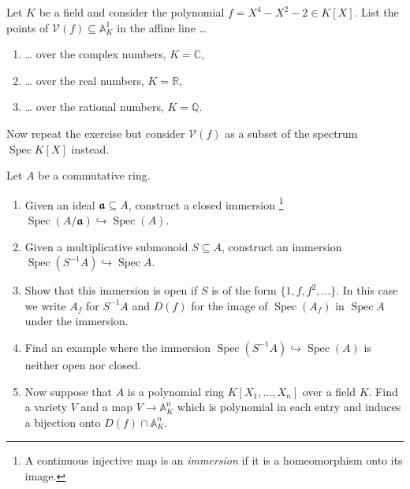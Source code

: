\documentclass{exercises}
\DeclareMathOperator{\Spec}{Spec}
\begin{document}
\begin{exercise}
  Let $K$ be a field and consider the polynomial $f=X^4-X^2-2 ∈ K[X]$.
  List the points of $𝒱(f)⊆𝔸^1_K$ in the affine line …
  \begin{enumerate}
    \item … over the complex numbers, $K=ℂ$,
    \item … over the real numbers, $K=ℝ$,
    \item … over the rational numbers, $K=ℚ$.
  \end{enumerate}
  Now repeat the exercise but consider $𝒱(f)$ as a subset of the spectrum $\Spec K[X]$ instead.
\end{exercise}

\begin{exercise}
  Let $A$ be a commutative ring.
  \begin{enumerate}
    \item Given an ideal $𝖆⊆A$, construct a closed immersion%
      \footnote{A continuous injective map is an \emph{immersion} if it is a homeomorphism onto its image.}
      $\Spec(A/𝖆) ↪ \Spec(A)$.
    \item Given a multiplicative submonoid $S⊆A$, construct an immersion $\Spec(S^{-1}A) ↪ \Spec A$.
    \item Show that this immersion is open if $S$ is of the form $\{1,f,f^2,\dots\}$.
      In this case we write $A_f$ for $S^{-1}A$ and $D(f)$ for the image of $\Spec(A_f)$ in $\Spec A$ under the immersion.
    \item Find an example where the immersion $\Spec(S^{-1}A) ↪ \Spec(A)$ is neither open nor closed.
    \item Now suppose that $A$ is a polynomial ring $K[X_1,\dots,X_n]$ over a field $K$.
      Find a variety $V$ and a map $V → 𝔸^n_K$ which is polynomial in each entry and induces a bijection onto $D(f)∩𝔸^n_K$.
  \end{enumerate}
\end{exercise}
\end{document}
